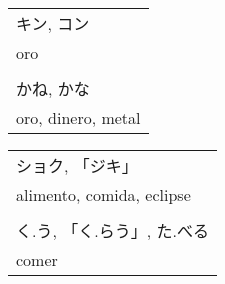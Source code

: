 \documentclass[a4paper,12pt,oneside]{report}
\begin{document}
\begin{CJK*}{UTF8}{min}
  \begin{minipage}{1.2in}
  \end{minipage}
  \begin{minipage}{3in}
    \begin{tabular}{l}
      キン, コン \\
      oro \\
      \\
      かね, かな \\
      oro, dinero, metal \\
    \end{tabular}
  \end{minipage}

  \begin{minipage}{1.2in}
  \end{minipage}
  \begin{minipage}{3in}
    \begin{tabular}{l}
      ショク, 「ジキ」 \\
      alimento, comida, eclipse\\
      \\
      く.う, 「く.らう」, た.べる \\
      comer
    \end{tabular}
  \end{minipage}



\end{CJK*}
\end{document}
